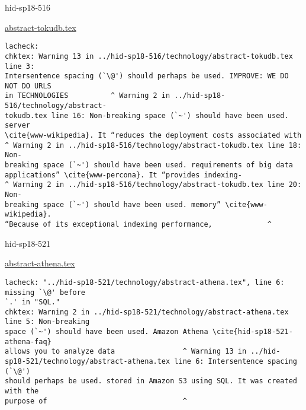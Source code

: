 

\begin{IU}

hid-sp18-516

\href{https://github.com/cloudmesh-community/hid-sp18-516/blob/master//technology/abstract-tokudb.tex}{abstract-tokudb.tex}

\begin{tiny}
\begin{verbatim}
lacheck: 
chktex: Warning 13 in ../hid-sp18-516/technology/abstract-tokudb.tex line 3:
Intersentence spacing (`\@') should perhaps be used. IMPROVE: WE DO NOT DO URLS
in TECHNOLOGIES          ^ Warning 2 in ../hid-sp18-516/technology/abstract-
tokudb.tex line 16: Non-breaking space (`~') should have been used. server
\cite{www-wikipedia}. It “reduces the deployment costs associated with
^ Warning 2 in ../hid-sp18-516/technology/abstract-tokudb.tex line 18: Non-
breaking space (`~') should have been used. requirements of big data
applications” \cite{www-percona}. It “provides indexing-
^ Warning 2 in ../hid-sp18-516/technology/abstract-tokudb.tex line 20: Non-
breaking space (`~') should have been used. memory” \cite{www-wikipedia}.
“Because of its exceptional indexing performance,             ^
\end{verbatim}
\end{tiny}
\end{IU}



\begin{IU}

hid-sp18-521

\href{https://github.com/cloudmesh-community/hid-sp18-521/blob/master//technology/abstract-athena.tex}{abstract-athena.tex}

\begin{tiny}
\begin{verbatim}
lacheck: "../hid-sp18-521/technology/abstract-athena.tex", line 6: missing `\@' before
`.' in "SQL."
chktex: Warning 2 in ../hid-sp18-521/technology/abstract-athena.tex line 5: Non-breaking
space (`~') should have been used. Amazon Athena \cite{hid-sp18-521-athena-faq}
allows you to analyze data                ^ Warning 13 in ../hid-
sp18-521/technology/abstract-athena.tex line 6: Intersentence spacing (`\@')
should perhaps be used. stored in Amazon S3 using SQL. It was created with the
purpose of                                ^
\end{verbatim}
\end{tiny}
\end{IU}

